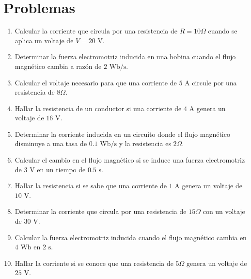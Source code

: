 \documentclass[../main]{subfiles}
\begin{document}
\section{Problemas}

\begin{enumerate}
    \item Calcular la corriente que circula por una resistencia de \(R = 10 \Omega\) cuando se aplica un voltaje de \(V = 20 \text{ V}\).
    \item Determinar la fuerza electromotriz inducida en una bobina cuando el flujo magnético cambia a razón de \(2 \text{ Wb/s}\).
    \item Calcular el voltaje necesario para que una corriente de \(5 \text{ A}\) circule por una resistencia de \(8 \Omega\).
    \item Hallar la resistencia de un conductor si una corriente de \(4 \text{ A}\) genera un voltaje de \(16 \text{ V}\).
    \item Determinar la corriente inducida en un circuito donde el flujo magnético disminuye a una tasa de \(0.1 \text{ Wb/s}\) y la resistencia es \(2 \Omega\).
    \item Calcular el cambio en el flujo magnético si se induce una fuerza electromotriz de \(3 \text{ V}\) en un tiempo de \(0.5 \text{ s}\).
    \item Hallar la resistencia si se sabe que una corriente de \(1 \text{ A}\) genera un voltaje de \(10 \text{ V}\).
    \item Determinar la corriente que circula por una resistencia de \(15 \Omega\) con un voltaje de \(30 \text{ V}\).
    \item Calcular la fuerza electromotriz inducida cuando el flujo magnético cambia en \(4 \text{ Wb}\) en \(2 \text{ s}\).
    \item Hallar la corriente si se conoce que una resistencia de \(5 \Omega\) genera un voltaje de \(25 \text{ V}\).
\end{enumerate}
\end{document}
